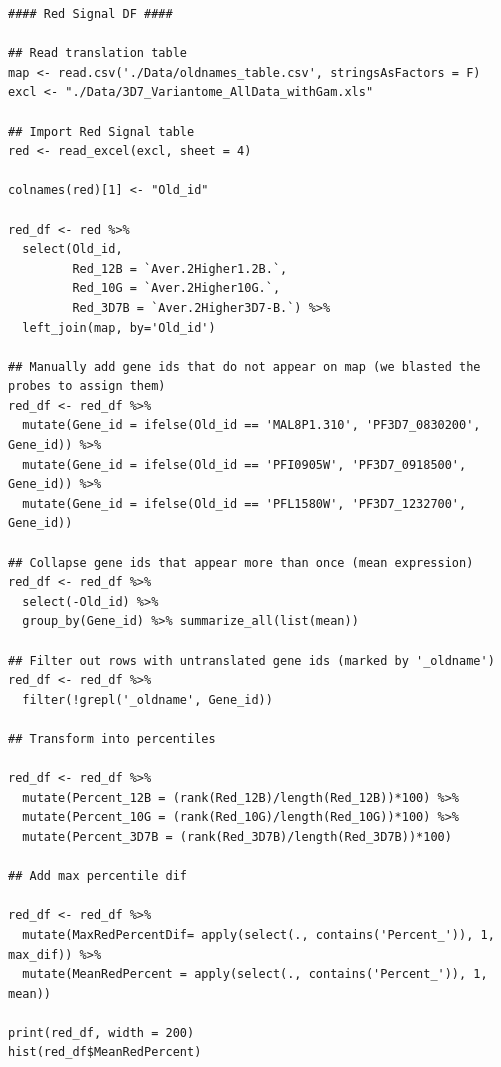 \documentclass[11pt]{article}
\begin{document}
\begin{verbatim}
#### Red Signal DF ####

## Read translation table
map <- read.csv('./Data/oldnames_table.csv', stringsAsFactors = F)
excl <- "./Data/3D7_Variantome_AllData_withGam.xls"

## Import Red Signal table
red <- read_excel(excl, sheet = 4)

colnames(red)[1] <- "Old_id"

red_df <- red %>%
  select(Old_id,
         Red_12B = `Aver.2Higher1.2B.`,
         Red_10G = `Aver.2Higher10G.`,
         Red_3D7B = `Aver.2Higher3D7-B.`) %>%
  left_join(map, by='Old_id')

## Manually add gene ids that do not appear on map (we blasted the probes to assign them)
red_df <- red_df %>%
  mutate(Gene_id = ifelse(Old_id == 'MAL8P1.310', 'PF3D7_0830200', Gene_id)) %>%
  mutate(Gene_id = ifelse(Old_id == 'PFI0905W', 'PF3D7_0918500', Gene_id)) %>%
  mutate(Gene_id = ifelse(Old_id == 'PFL1580W', 'PF3D7_1232700', Gene_id))

## Collapse gene ids that appear more than once (mean expression)
red_df <- red_df %>%
  select(-Old_id) %>%
  group_by(Gene_id) %>% summarize_all(list(mean))

## Filter out rows with untranslated gene ids (marked by '_oldname')
red_df <- red_df %>%
  filter(!grepl('_oldname', Gene_id))

## Transform into percentiles

red_df <- red_df %>%
  mutate(Percent_12B = (rank(Red_12B)/length(Red_12B))*100) %>%
  mutate(Percent_10G = (rank(Red_10G)/length(Red_10G))*100) %>%
  mutate(Percent_3D7B = (rank(Red_3D7B)/length(Red_3D7B))*100)

## Add max percentile dif

red_df <- red_df %>%
  mutate(MaxRedPercentDif= apply(select(., contains('Percent_')), 1, max_dif)) %>%
  mutate(MeanRedPercent = apply(select(., contains('Percent_')), 1, mean))

print(red_df, width = 200)
hist(red_df$MeanRedPercent)
\end{verbatim}
\end{document}
